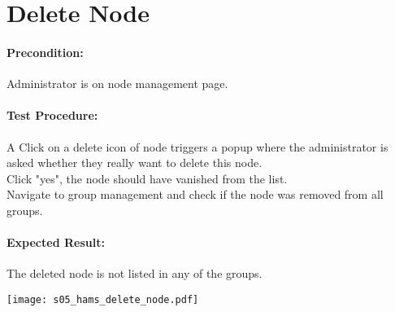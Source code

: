 \documentclass{scrreprt}
\begin{document}
\begin{minipage}[c]{0.4\textwidth}
\section{Delete Node}

\paragraph{Precondition:}
Administrator is on node management page.\\

\paragraph{Test Procedure:}
A Click on a delete icon of node triggers a popup where the administrator is asked whether they really want to delete this node.\\
Click "yes", the node should have vanished from the list.\\
Navigate to group management and check if the node was removed from all groups.\\

\paragraph{Expected Result:}
The deleted node is not listed in any of the groups.

\end{minipage}
\hfill
\begin{minipage}[c]{0.5\textwidth}
	\texttt{[image: s05\_hams\_delete\_node.pdf]}
\end{minipage}
\end{document}
